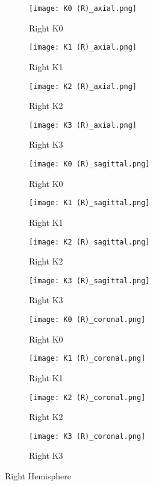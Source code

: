 \documentclass[12pt,fullpage]{article}
\begin{document}
\begin{figure}[h!]
  \centering
  \begin{subfigure}[b]{0.2\linewidth}
    \texttt{[image: K0 (R)\_axial.png]}
    \caption{Right K0}
  \end{subfigure}
  \begin{subfigure}[b]{0.2\linewidth}
    \texttt{[image: K1 (R)\_axial.png]}
    \caption{Right K1}
  \end{subfigure}
  \begin{subfigure}[b]{0.2\linewidth}
    \texttt{[image: K2 (R)\_axial.png]}
    \caption{Right K2}
  \end{subfigure}
    \begin{subfigure}[b]{0.2\linewidth}
    \texttt{[image: K3 (R)\_axial.png]}
    \caption{Right K3}
  \end{subfigure}
    \begin{subfigure}[b]{0.2\linewidth}
    \texttt{[image: K0 (R)\_sagittal.png]}
    \caption{Right K0}
  \end{subfigure}
      \begin{subfigure}[b]{0.2\linewidth}
    \texttt{[image: K1 (R)\_sagittal.png]}
    \caption{Right K1}
  \end{subfigure}
    \begin{subfigure}[b]{0.2\linewidth}
    \texttt{[image: K2 (R)\_sagittal.png]}
    \caption{Right K2}
  \end{subfigure}
    \begin{subfigure}[b]{0.2\linewidth}
    \texttt{[image: K3 (R)\_sagittal.png]}
    \caption{Right K3}
  \end{subfigure}
    \begin{subfigure}[b]{0.2\linewidth}
    \texttt{[image: K0 (R)\_coronal.png]}
    \caption{Right K0}
  \end{subfigure}
      \begin{subfigure}[b]{0.2\linewidth}
    \texttt{[image: K1 (R)\_coronal.png]}
    \caption{Right K1}
  \end{subfigure}
    \begin{subfigure}[b]{0.2\linewidth}
    \texttt{[image: K2 (R)\_coronal.png]}
    \caption{Right K2}
  \end{subfigure}
    \begin{subfigure}[b]{0.2\linewidth}
    \texttt{[image: K3 (R)\_coronal.png]}
    \caption{Right K3}
  \end{subfigure}
  \caption{Right Hemisphere}
  \label{fig:right}
\end{figure}
\end{document}
